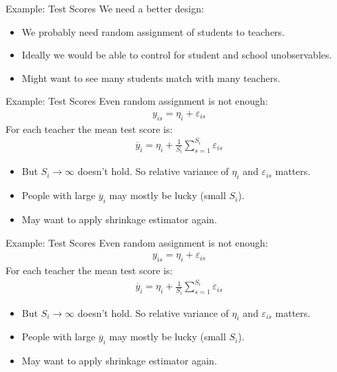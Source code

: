 \documentclass[xcolor=pdftex,dvipsnames,table,mathserif,aspectratio=169]{beamer}
\begin{document}
\begin{frame}{Example: Test Scores}
We need a better design:
\begin{itemize}
\item We probably need random assignment of students to teachers.
\item Ideally we would be able to control for student and school unobservables.
\item Might want to see many students match with many teachers.
\end{itemize}
\end{frame}

\begin{frame}{Example: Test Scores}
Even random assignment is not enough:
\begin{align*}
y_{is} =  \eta_i + \varepsilon_{is}
\end{align*}
For each teacher the mean test score is:
\begin{align*}
\overline{y}_{i} =  \eta_i + \frac{1}{S_i} \sum_{s=1}^{S_i} \varepsilon_{is}
\end{align*}
\begin{itemize}
\item But $S_i \rightarrow \infty$ doesn't hold. So relative variance of $\eta_i$ and $\varepsilon_{is}$ matters.
\item People with large $\overline{y}_i$ may mostly be lucky (small $S_i$).
\item May want to apply \alert{shrinkage} estimator again.
\end{itemize}
\end{frame}



\begin{frame}{Example: Test Scores}
Even random assignment is not enough:
\begin{align*}
y_{is} =  \eta_i + \varepsilon_{is}
\end{align*}
For each teacher the mean test score is:
\begin{align*}
\overline{y}_{i} =  \eta_i + \frac{1}{S_i} \sum_{s=1}^{S_i} \varepsilon_{is}
\end{align*}
\begin{itemize}
\item But $S_i \rightarrow \infty$ doesn't hold. So relative variance of $\eta_i$ and $\varepsilon_{is}$ matters.
\item People with large $\overline{y}_i$ may mostly be lucky (small $S_i$).
\item May want to apply \alert{shrinkage} estimator again.
\end{itemize}
\end{frame}
\end{document}
